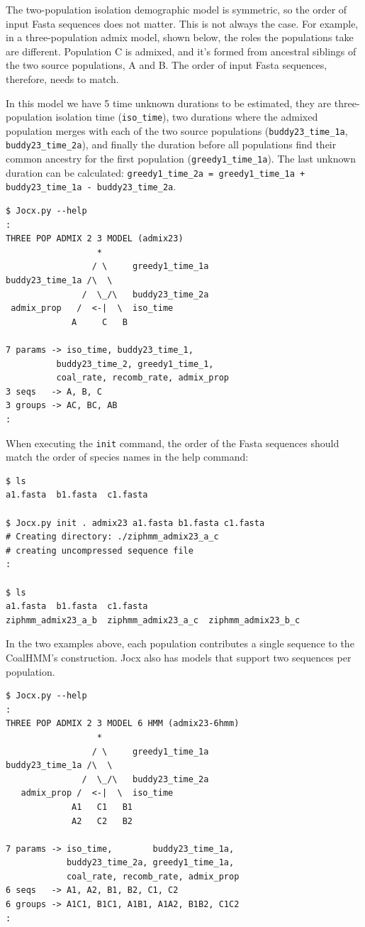 \documentclass[graybox]{svmult}
\begin{document}
The two-population isolation demographic model is symmetric, so the order of input Fasta sequences does not matter. This is not always the case. For example, in a three-population admix model, shown below, the roles the populations take are different. Population C is admixed, and it's formed from ancestral siblings of the two source populations, A and B. The order of input Fasta sequences, therefore, needs to match.

In this model we have 5 time unknown durations to be estimated, they are three-population isolation time (\texttt{iso\_time}), two durations where the admixed population merges with each of the two source populations (\texttt{buddy23\_time\_1a}, \texttt{buddy23\_time\_2a}), and finally the duration before all populations find their common ancestry for the first population (\texttt{greedy1\_time\_1a}).  The last unknown duration can be calculated: \texttt{greedy1\_time\_2a = greedy1\_time\_1a + buddy23\_time\_1a - buddy23\_time\_2a}.

 {\scriptsize{}\begin{verbatim}
$ Jocx.py --help
:
THREE POP ADMIX 2 3 MODEL (admix23)
                  *
                 / \     greedy1_time_1a
buddy23_time_1a /\  \
               /  \_/\   buddy23_time_2a
 admix_prop   /  <-|  \  iso_time
             A     C   B

7 params -> iso_time, buddy23_time_1,
          buddy23_time_2, greedy1_time_1,
          coal_rate, recomb_rate, admix_prop
3 seqs   -> A, B, C
3 groups -> AC, BC, AB
:
\end{verbatim}}

When executing the \texttt{init} command, the order of the Fasta sequences should match the order of species names in the help command:

 {\scriptsize{}\begin{verbatim}
$ ls
a1.fasta  b1.fasta  c1.fasta

$ Jocx.py init . admix23 a1.fasta b1.fasta c1.fasta
# Creating directory: ./ziphmm_admix23_a_c
# creating uncompressed sequence file
:

$ ls
a1.fasta  b1.fasta  c1.fasta
ziphmm_admix23_a_b  ziphmm_admix23_a_c  ziphmm_admix23_b_c
\end{verbatim}}

In the two examples above, each population contributes a single sequence to the CoalHMM's construction. Jocx also has models that support two sequences per population.

 {\scriptsize{}\begin{verbatim}
$ Jocx.py --help
:
THREE POP ADMIX 2 3 MODEL 6 HMM (admix23-6hmm)
                  *
                 / \     greedy1_time_1a
buddy23_time_1a /\  \
               /  \_/\   buddy23_time_2a
   admix_prop /  <-|  \  iso_time
             A1   C1   B1
             A2   C2   B2

7 params -> iso_time,        buddy23_time_1a,
            buddy23_time_2a, greedy1_time_1a,
            coal_rate, recomb_rate, admix_prop
6 seqs   -> A1, A2, B1, B2, C1, C2
6 groups -> A1C1, B1C1, A1B1, A1A2, B1B2, C1C2
:
\end{verbatim}}
\end{document}
